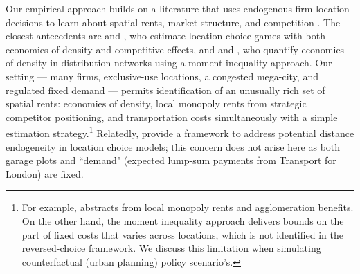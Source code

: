 \documentclass[12pt]{article}
\begin{document}
Our empirical approach builds on a literature 
that uses endogenous firm location decisions to learn about spatial rents, market structure, and competition 
\citep[e.g.,][]{Mazzeo2002, Seim2006, Jia2008, Holmes2011, 
ellickson2013estimating, nishida2015estimating, zheng2016spatial, oberfield2023plants}. The 
closest antecedents are \citet{Jia2008} and \citet{nishida2015estimating}, 
who estimate location choice games with both economies of density and 
competitive effects, and \citet{Holmes2011} and \citet{houde2023nexus}, who 
quantify economies of density in distribution networks using a moment 
inequality approach. Our 
setting --- many firms, exclusive-use locations, a congested mega-city, and regulated fixed demand --- permits 
identification of an unusually rich set of spatial rents: economies of density, local monopoly rents from strategic 
competitor positioning, and transportation costs simultaneously with a simple estimation strategy.\footnote{For example, \citet{Holmes2011} abstracts from local monopoly rents and agglomeration benefits. On the other hand, the moment inequality approach delivers bounds on the part of fixed costs that varies across locations, which is not identified in the reversed-choice framework. We discuss this limitation when simulating counterfactual (urban planning) policy scenario's.}  %
Relatedly, \citet{Cao2026} provide a framework to address potential distance endogeneity in location choice models; this concern does not arise here as both garage plots and ``demand" (expected lump-sum payments from Transport for London) are fixed. 
\end{document}
